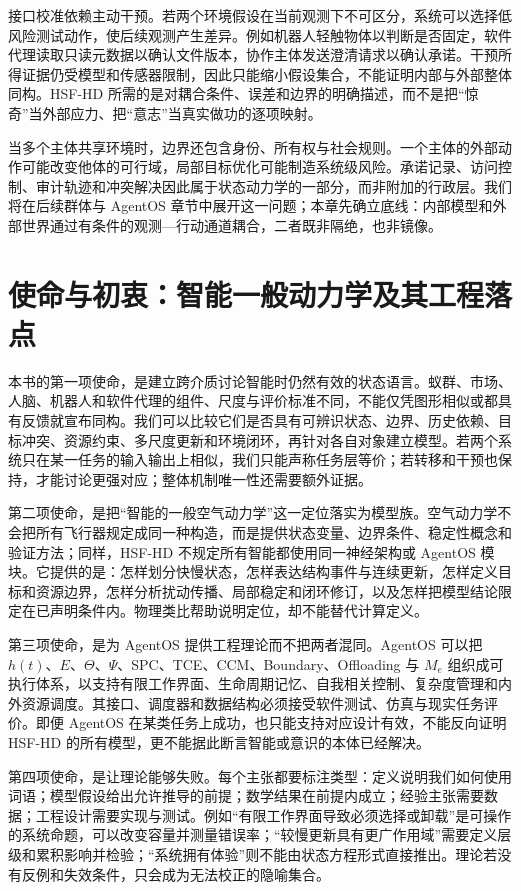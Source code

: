 接口校准依赖主动干预。若两个环境假设在当前观测下不可区分，系统可以选择低风险测试动作，使后续观测产生差异。例如机器人轻触物体以判断是否固定，软件代理读取只读元数据以确认文件版本，协作主体发送澄清请求以确认承诺。干预所得证据仍受模型和传感器限制，因此只能缩小假设集合，不能证明内部与外部整体同构。HSF-HD 所需的是对耦合条件、误差和边界的明确描述，而不是把“惊奇”当外部应力、把“意志”当真实做功的逐项映射。

当多个主体共享环境时，边界还包含身份、所有权与社会规则。一个主体的外部动作可能改变他体的可行域，局部目标优化可能制造系统级风险。承诺记录、访问控制、审计轨迹和冲突解决因此属于状态动力学的一部分，而非附加的行政层。我们将在后续群体与 AgentOS 章节中展开这一问题；本章先确立底线：内部模型和外部世界通过有条件的观测—行动通道耦合，二者既非隔绝，也非镜像。

\section{使命与初衷：智能一般动力学及其工程落点}
\label{sec:section_6075}

本书的第一项使命，是建立跨介质讨论智能时仍然有效的状态语言。蚁群、市场、人脑、机器人和软件代理的组件、尺度与评价标准不同，不能仅凭图形相似或都具有反馈就宣布同构。我们可以比较它们是否具有可辨识状态、边界、历史依赖、目标冲突、资源约束、多尺度更新和环境闭环，再针对各自对象建立模型。若两个系统只在某一任务的输入输出上相似，我们只能声称任务层等价；若转移和干预也保持，才能讨论更强对应；整体机制唯一性还需要额外证据。

第二项使命，是把“智能的一般空气动力学”这一定位落实为模型族。空气动力学不会把所有飞行器规定成同一种构造，而是提供状态变量、边界条件、稳定性概念和验证方法；同样，HSF-HD 不规定所有智能都使用同一神经架构或 AgentOS 模块。它提供的是：怎样划分快慢状态，怎样表达结构事件与连续更新，怎样定义目标和资源边界，怎样分析扰动传播、局部稳定和闭环修订，以及怎样把模型结论限定在已声明条件内。物理类比帮助说明定位，却不能替代计算定义。

第三项使命，是为 AgentOS 提供工程理论而不把两者混同。AgentOS 可以把 $h(t)$、$E$、$\Theta$、$\Psi$、SPC、TCE、CCM、Boundary、Offloading 与 $M_e$ 组织成可执行体系，以支持有限工作界面、生命周期记忆、自我相关控制、复杂度管理和内外资源调度。其接口、调度器和数据结构必须接受软件测试、仿真与现实任务评价。即便 AgentOS 在某类任务上成功，也只能支持对应设计有效，不能反向证明 HSF-HD 的所有模型，更不能据此断言智能或意识的本体已经解决。

第四项使命，是让理论能够失败。每个主张都要标注类型：定义说明我们如何使用词语；模型假设给出允许推导的前提；数学结果在前提内成立；经验主张需要数据；工程设计需要实现与测试。例如“有限工作界面导致必须选择或卸载”是可操作的系统命题，可以改变容量并测量错误率；“较慢更新具有更广作用域”需要定义层级和累积影响并检验；“系统拥有体验”则不能由状态方程形式直接推出。理论若没有反例和失效条件，只会成为无法校正的隐喻集合。

